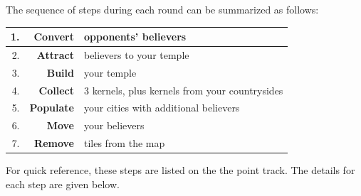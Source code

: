 The sequence of steps during each round can be summarized as follows:
\begin{center}
\begin{tabular}{|rrl|}
\hline
1.&{\bf Convert}& opponents' believers\\
\hline
2.&{\bf Attract}& believers to your temple\\
\hline
3.&{\bf Build}& your temple\\
\hline
4.&{\bf Collect}& 3 kernels, plus kernels from your countrysides\\
\hline
5.&{\bf Populate}& your cities with additional believers\\
\hline
6.&{\bf Move}& your believers\\
\hline
7.&{\bf Remove}& tiles from the map\\
\hline
\end{tabular}
\end{center}
For quick reference, these steps are listed on the the point track.
The details for each step are given below.
